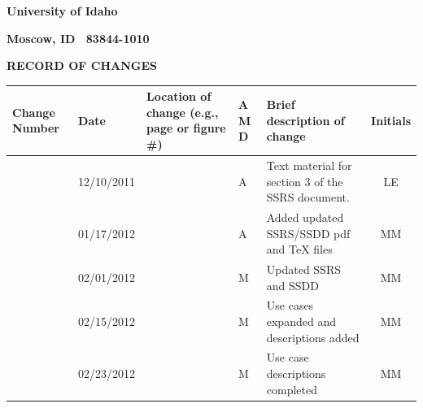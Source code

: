 \documentclass[twoside,letterpaper]{article}
\begin{document}
{\centering\bfseries
University of Idaho
\par}

{\centering\bfseries
Moscow, ID \ 83844-1010
\par}



\bigskip





{\centering\bfseries RECORD OF CHANGES \par}


\bigskip

\begin{flushleft}
\tablehead{}
\begin{supertabular}[c]{|m{0.75in}|m{1.0in}|m{1.5in}|m{0.25in}|m{2in}|c|}
\hline

\centering \bfseries Change
\centering \bfseries Number
&

\centering \bfseries Date
\par
&

\centering \bfseries Location of change\newline
\centering \bfseries(e.g., page or figure \#)
&

\centering \bfseries A\newline
\centering \bfseries M\newline
\centering \bfseries D  
&

\centering \bfseries Brief description\newline
\centering \bfseries of change
&
\bfseries Initials
\\\hline

& 12/10/2011
& ~
& \centering A
& Text material for section 3 of the SSRS document.
& LE

\\\hline
{}
& 01/17/2012
& ~
& \centering A
& Added updated SSRS/SSDD pdf and TeX files
& MM

\\\hline
{}
& 02/01/2012
& ~
& \centering M
& Updated SSRS and SSDD
& MM

\\\hline
{}
& 02/15/2012
& ~
& \centering M
& Use cases expanded and descriptions added
& MM

\\\hline
{}
& 02/23/2012
& ~
& \centering M
& Use case descriptions completed
& MM

\\\hline
\end{supertabular}
\end{flushleft}
\end{document}
